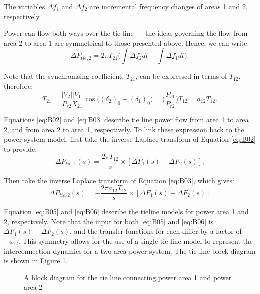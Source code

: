 The variables $\Delta f_1$ and $\Delta f_2$ are incremental frequency changes of areas 1 and 2, respectively.

Power can flow both ways over the tie line --- the ideas governing the flow from area 2 to area 1 are symmetrical to those presented above. Hence, we can write:
\begin{equation}
	\Delta P_{tie, 2} = 2 \pi T_{21} \bigg( \int \Delta f_2 dt - \int \Delta f_1 dt \bigg). \label{eq:B03}
\end{equation}

Note that the synchronising coefficient, $T_{21}$, can be expressed in terms of $T_{12}$, therefore:
\begin{equation}
	T_{21} = \frac{|V_2||V_1|}{P_{r2} X_{21}} \cos \big( (\delta_2)_0 - (\delta_1)_0 \big) = \bigg( \frac{P_{r1}}{P_{r2}} \bigg) T_{12} = a_{12} T_{12}. \label{eq:B04}
\end{equation}

Equations \ref{eq:B02} and \ref{eq:B03} describe tie line power flow from area 1 to area 2, and from area 2 to area 1, respectively. To link these expression back to the power system model, first take the inverse Laplace transform of Equation \ref{eq:B02} to provide:
\begin{equation}
	\Delta P_{tie,1}(s) = \frac{2 \pi T_{12}}{s} \times [\Delta F_1(s) - \Delta F_2(s)]. \label{eq:B05}
\end{equation}

Then take the inverse Laplace transform of Equation \ref{eq:B03}, which gives:
\begin{equation}
	\Delta P_{tie,2}(s) = - \frac{2 \pi a_{12} T_{12}}{s} \times [\Delta F_1(s) - \Delta F_2(s)] \label{eq:B06}
\end{equation}

Equation \ref{eq:B05} and \ref{eq:B06} describe the tieline models for power area 1 and 2, respectively. Note that the input for both \ref{eq:B05} and \ref{eq:B06} is $\Delta F_1(s) - \Delta F_2(s)$, and the transfer functions for each differ by a factor of $-a_{12}$. This symmetry allows for the use of a single tie-line model to represent the interconnection dynamics for a two area power system. The tie line block diagram is shown in Figure \ref{fig:B101_tie_line_model}.

\begin{figure}[h]
	\centering
	
	\caption[Tie line model]{A block diagram for the tie line connecting power area 1 and power area 2}
	\label{fig:B101_tie_line_model}
\end{figure}